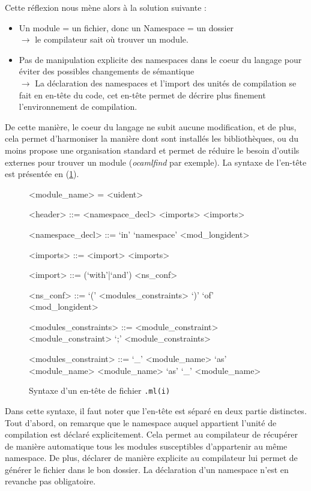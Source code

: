 \documentclass[11pt,a4paper]{report}
\begin{document}
Cette réflexion nous mène alors à la solution suivante :
\begin{itemize}
\item Un module = un fichier, donc un Namespace = un dossier \\
  $\rightarrow$ le compilateur sait où trouver un module.
\item Pas de manipulation explicite des namespaces dans le coeur du langage pour
  éviter des possibles changements de sémantique \\
  $\rightarrow$ La déclaration des namespaces et l'import des unités de
  compilation se fait en en-tête du code, cet en-tête permet de décrire plus
  finement l'environnement de compilation.
\end{itemize}

De cette manière, le coeur du langage ne subit aucune modification, et de plus,
cela permet d'harmoniser la manière dont sont installés les bibliothèques, ou du
moins propose une organisation standard et permet de réduire le besoin d'outils
externes pour trouver un module (\emph{ocamlfind} par exemple). La syntaxe de
l'en-tête est présentée en (\ref{header-bnf}).

\begin{figure}
\begin{grammar}
<module_name> = <uident>

<header> ::= <namespace_decl> <imports>
\alt <imports>

<namespace_decl> ::= `in' `namespace' <mod_longident>

<imports> ::= <import> <imports> 

<import> ::= (`with'|`and') <ns_conf> 

<ns_conf> ::= `(' <modules_constraints> `)' `of' <mod_longident>

<modules_constraints> ::= <module_constraint>
\alt <module_constraint> `;' <module_constraints>

<modules_constraint> ::= `_'
\alt <module_name> `as' <module_name>
\alt <module_name> `as' `_'
\alt <module_name>
\end{grammar}
\caption{Syntaxe d'un en-tête de fichier \texttt{.ml(i)}}
\label{header-bnf}
\end{figure}

Dans cette syntaxe, il faut noter que l'en-tête est séparé en deux partie
distinctes. Tout d'abord, on remarque que le namespace auquel appartient l'unité
de compilation est déclaré explicitement. Cela permet au compilateur de
récupérer de manière automatique tous les modules susceptibles d'appartenir au
même namespace. De plus, déclarer de manière explicite au compilateur lui permet
de générer le fichier dans le bon dossier. La déclaration d'un namespace n'est
en revanche pas obligatoire.
\end{document}
